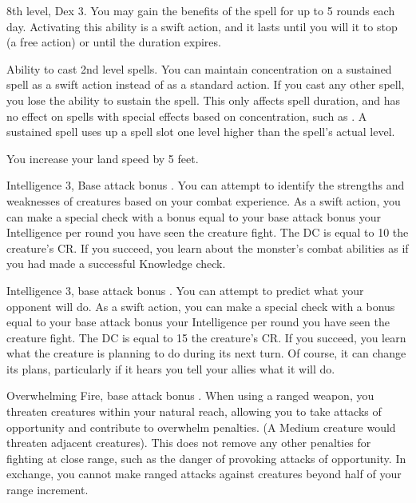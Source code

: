 \featpre 8th level, Dex 3.
\featben You may gain the benefits of the  spell for up to 5 rounds each day. Activating this ability is a swift action, and it lasts until you will it to stop (a free action) or until the duration expires.

\featpre Ability to cast 2nd level spells.
\featben You can maintain concentration on a sustained spell as a swift action instead of as a standard action. If you cast any other spell, you lose the ability to sustain the spell. This only affects spell duration, and has no effect on spells with special effects based on concentration, such as . A sustained spell uses up a spell slot one level higher than the spell's actual level.

 You increase your land speed by 5 feet.

 Intelligence 3, Base attack bonus .
 You can attempt to identify the strengths and weaknesses of creatures based on your combat experience. As a swift action, you can make a special check with a bonus equal to your base attack bonus \add your Intelligence  per round you have seen the creature fight. The DC is equal to 10 \add the creature's CR. If you succeed, you learn about the monster's combat abilities as if you had made a successful Knowledge check.

 Intelligence 3, base attack bonus .
 You can attempt to predict what your opponent will do. As a swift action, you can make a special check with a bonus equal to your base attack bonus \add your Intelligence  per round you have seen the creature fight. The DC is equal to 15 \add the creature's CR. If you succeed, you learn what the creature is planning to do during its next turn. Of course, it can change its plans, particularly if it hears you tell your allies what it will do.

\featpre Overwhelming Fire, base attack bonus .
\featben When using a ranged weapon, you threaten creatures within your natural reach, allowing you to take attacks of opportunity and contribute to overwhelm penalties. (A Medium creature would threaten adjacent creatures). This does not remove any other penalties for fighting at close range, such as the danger of provoking attacks of opportunity. In exchange, you cannot make ranged attacks against creatures beyond half of your range increment.

